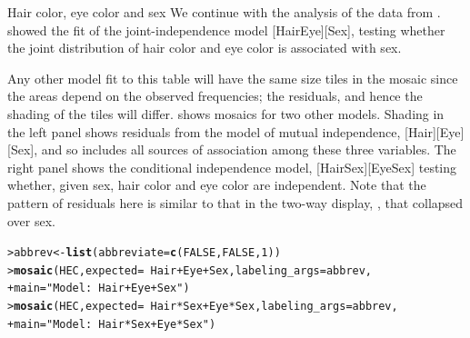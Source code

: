 \documentclass[10pt,krantz2]{krantz}\usepackage[]{graphicx}\usepackage[]{color}
\makeatletter
\newcommand{\hlnum}[1]{\textcolor[rgb]{0.686,0.059,0.569}{#1}}%
\newcommand{\hlstr}[1]{\textcolor[rgb]{0.192,0.494,0.8}{#1}}%
\newcommand{\hlopt}[1]{\textcolor[rgb]{0,0,0}{#1}}%
\newcommand{\hlstd}[1]{\textcolor[rgb]{0.345,0.345,0.345}{#1}}%
\newcommand{\hlkwb}[1]{\textcolor[rgb]{0.69,0.353,0.396}{#1}}%
\newcommand{\hlkwc}[1]{\textcolor[rgb]{0.333,0.667,0.333}{#1}}%
\newcommand{\hlkwd}[1]{\textcolor[rgb]{0.737,0.353,0.396}{\textbf{#1}}}%
\newenvironment{kframe}{%
 \def\at@end@of@kframe{}%
 \ifinner\ifhmode%
  \def\at@end@of@kframe{\end{minipage}}%
  \begin{minipage}{\columnwidth}%
 \fi\fi%
 \def\FrameCommand##1{\hskip\@totalleftmargin \hskip-\fboxsep
 \colorbox{shadecolor}{##1}\hskip-\fboxsep
     \hskip-\linewidth \hskip-\@totalleftmargin \hskip\columnwidth}%
 \MakeFramed {\advance\hsize-\width
   \@totalleftmargin\z@ \linewidth\hsize
   \@setminipage}}%
 {\par\unskip\endMakeFramed%
 \at@end@of@kframe}
\newenvironment{knitrout}{}{} %
\renewenvironment{knitrout}{\small\renewcommand{\baselinestretch}{.85}}{} %
\makeatother
\begin{document}

\begin{Example}[HEC2]{Hair color, eye color and sex}
We continue with the analysis of the  data from
.   showed the fit of the
joint-independence model [HairEye][Sex], testing whether
the joint distribution of hair color and eye color is
associated with sex.

Any other model fit to this table will have the same size tiles in the mosaic
since the areas depend on the observed frequencies;  the residuals,
and hence the shading of the tiles will differ.  
shows mosaics for two other models. Shading in the left panel shows
residuals from the model of mutual independence, [Hair][Eye][Sex], and so
includes all sources of association among these three variables.
The right panel shows the
conditional independence model, [HairSex][EyeSex]
testing whether, given sex, hair color and eye color are independent.
Note that the pattern of residuals here is
similar to that in the two-way display,
, that collapsed over sex.

\begin{knitrout}
\color{fgcolor}\begin{kframe}
\begin{alltt}
\hlstd{> }\hlstd{abbrev} \hlkwb{<-} \hlkwd{list}\hlstd{(}\hlkwc{abbreviate}\hlstd{=}\hlkwd{c}\hlstd{(}\hlnum{FALSE}\hlstd{,} \hlnum{FALSE}\hlstd{,} \hlnum{1}\hlstd{))}
\hlstd{> }\hlkwd{mosaic}\hlstd{(HEC,} \hlkwc{expected} \hlstd{=} \hlopt{~} \hlstd{Hair} \hlopt{+} \hlstd{Eye} \hlopt{+} \hlstd{Sex,} \hlkwc{labeling_args} \hlstd{= abbrev,}
\hlstd{+ }  \hlkwc{main} \hlstd{=} \hlstr{"Model: ~ Hair + Eye + Sex"}\hlstd{)}
\hlstd{> }\hlkwd{mosaic}\hlstd{(HEC,} \hlkwc{expected} \hlstd{=} \hlopt{~} \hlstd{Hair} \hlopt{*} \hlstd{Sex} \hlopt{+} \hlstd{Eye} \hlopt{*} \hlstd{Sex,} \hlkwc{labeling_args} \hlstd{= abbrev,}
\hlstd{+ }        \hlkwc{main}\hlstd{=}\hlstr{"Model: ~ Hair*Sex + Eye*Sex"}\hlstd{)}
\end{alltt}
\end{kframe}\begin{figure}[!htbp]


\end{figure}
\end{knitrout}
\end{Example}
\end{document}
